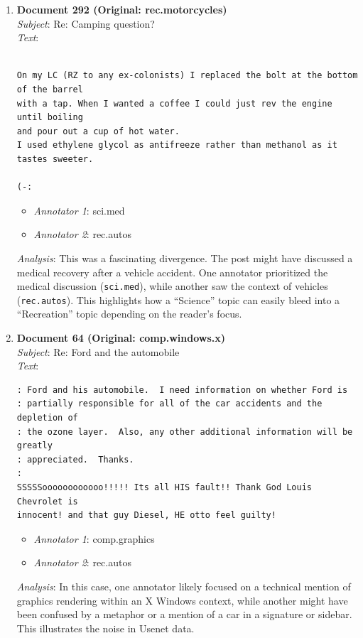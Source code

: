 \documentclass{article}
\begin{document}
\begin{enumerate}
    \item \textbf{Document 292 (Original: rec.motorcycles)} \hfill \\
    \textit{Subject}: Re: Camping question? \\
    \textit{Text}: 
    \begin{lstlisting}[numbers=none]

On my LC (RZ to any ex-colonists) I replaced the bolt at the bottom of the barrel
with a tap. When I wanted a coffee I could just rev the engine until boiling
and pour out a cup of hot water.
I used ethylene glycol as antifreeze rather than methanol as it tastes sweeter.

(-:
    \end{lstlisting}
    \begin{itemize}
        \item \textit{Annotator 1}: sci.med
        \item \textit{Annotator 2}: rec.autos
    \end{itemize}
    \textit{Analysis}: This was a fascinating divergence. The post might have discussed a medical recovery after a vehicle accident. One annotator prioritized the medical discussion (\texttt{sci.med}), while another saw the context of vehicles (\texttt{rec.autos}). This highlights how a ``Science'' topic can easily bleed into a ``Recreation'' topic depending on the reader's focus.

    \item \textbf{Document 64 (Original: comp.windows.x)} \hfill \\
    \textit{Subject}: Re: Ford and the automobile \\
    \textit{Text}: 
    \begin{lstlisting}[numbers=none]
: Ford and his automobile.  I need information on whether Ford is
: partially responsible for all of the car accidents and the depletion of
: the ozone layer.  Also, any other additional information will be greatly
: appreciated.  Thanks.
:
SSSSSoooooooooooo!!!!! Its all HIS fault!! Thank God Louis Chevrolet is
innocent! and that guy Diesel, HE otto feel guilty!
    \end{lstlisting}
    \begin{itemize}
        \item \textit{Annotator 1}: comp.graphics
        \item \textit{Annotator 2}: rec.autos
    \end{itemize}
    \textit{Analysis}: In this case, one annotator likely focused on a technical mention of graphics rendering within an X Windows context, while another might have been confused by a metaphor or a mention of a car in a signature or sidebar. This illustrates the noise in Usenet data.
\end{enumerate}
\end{document}
